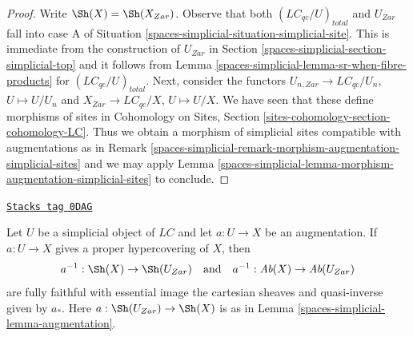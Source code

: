 \begin{proof}
Write $\Sh(X) = \Sh(X_{Zar})$. Observe that both
$(\textit{LC}_{qc}/U)_{total}$ and $U_{Zar}$ fall
into case A of Situation \ref{spaces-simplicial-situation-simplicial-site}.
This is immediate from the construction of
$U_{Zar}$ in Section \ref{spaces-simplicial-section-simplicial-top}
and it follows from Lemma \ref{spaces-simplicial-lemma-sr-when-fibre-products}
for $(\textit{LC}_{qc}/U)_{total}$.
Next, consider the functors
$U_{n, Zar} \to \textit{LC}_{qc}/U_n$, $U \mapsto U/U_n$
and
$X_{Zar} \to \textit{LC}_{qc}/X$, $U \mapsto U/X$.
We have seen that these define morphisms of sites
in Cohomology on Sites, Section \ref{sites-cohomology-section-cohomology-LC}.
Thus we obtain a morphism of simplicial sites compatible with
augmentations as in Remark \ref{spaces-simplicial-remark-morphism-augmentation-simplicial-sites}
and we may apply
Lemma \ref{spaces-simplicial-lemma-morphism-augmentation-simplicial-sites} to conclude.
\end{proof}

\begin{lemma}
\label{spaces-simplicial-lemma-descent-sheaves-for-proper-hypercovering}
\href{https://stacks.math.columbia.edu/tag/0DAG}{\texttt{Stacks tag 0DAG}}

Let $U$ be a simplicial object of $\textit{LC}$ and let $a : U \to X$
be an augmentation. If $a : U \to X$ gives a proper hypercovering of $X$,
then
$$
a^{-1} : \Sh(X) \to \Sh(U_{Zar})
\quad\text{and}\quad
a^{-1} : \textit{Ab}(X) \to \textit{Ab}(U_{Zar})
$$
are fully faithful with essential image the cartesian sheaves and
quasi-inverse given by $a_*$. Here $a : \Sh(U_{Zar}) \to \Sh(X)$ is as in
Lemma \ref{spaces-simplicial-lemma-augmentation}.
\end{lemma}

